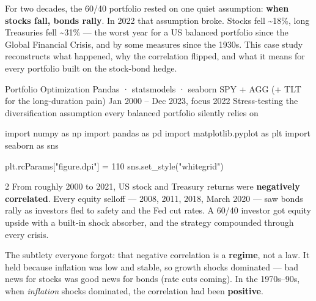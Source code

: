 \documentclass{pyportfolios-note}
\begin{document}
\thispagestyle{notecover}




For two decades, the 60/40 portfolio rested on one quiet assumption:
\textbf{when stocks fall, bonds rally}. In 2022 that assumption broke. Stocks
fell \textasciitilde18\%, long Treasuries fell \textasciitilde31\% — the worst
year for a US balanced portfolio since the Global Financial Crisis, and by some
measures since the 1930s. This case study reconstructs what happened, why the
correlation flipped, and what it means for every portfolio built on the
stock-bond hedge.

\notecard
  {Portfolio Optimization}
  {Pandas · statsmodels · seaborn}
  {SPY + AGG (+ TLT for the long-duration pain)}
  {Jan 2000 – Dec 2023, focus 2022}
  {Stress-testing the diversification assumption every balanced portfolio
   silently relies on}

\begin{notecode}
import numpy as np
import pandas as pd
import matplotlib.pyplot as plt
import seaborn as sns

plt.rcParams["figure.dpi"] = 110
sns.set_style("whitegrid")
\end{notecode}

\noteneedroom{170bp}

\begin{multicols}{2}
From roughly 2000 to 2021, US stock and Treasury returns were \textbf{negatively
correlated}. Every equity selloff — 2008, 2011, 2018, March 2020 — saw bonds
rally as investors fled to safety and the Fed cut rates. A 60/40 investor got
equity upside with a built-in shock absorber, and the strategy compounded
through every crisis.

The subtlety everyone forgot: that negative correlation is a \textbf{regime},
not a law. It held because inflation was low and stable, so growth shocks
dominated — bad news for stocks was good news for bonds (rate cuts coming). In
the 1970s–90s, when \textit{inflation} shocks dominated, the correlation had
been \textbf{positive}.
\end{multicols}
\end{document}

